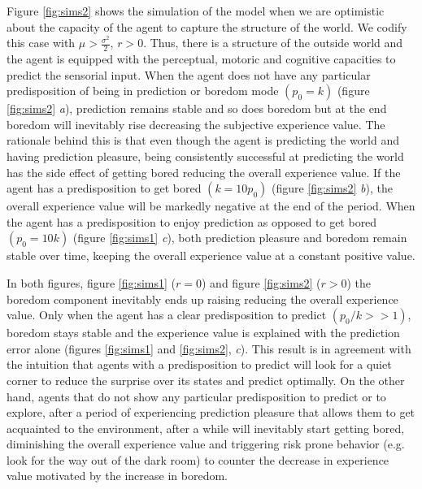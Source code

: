 \documentclass[11pt, onecolumn]{article}
\begin{document}
Figure \ref{fig:sims2} shows the simulation of the model when we are optimistic about the capacity  of the agent to capture the structure of the world. We codify this case with $ \mu > \frac{\sigma ^2}{2}$, $r>0$. Thus, there  is a structure of the outside world and the agent is equipped with the perceptual, motoric and cognitive capacities to predict the sensorial input.
When the agent does not have any particular predisposition of being in prediction or boredom mode $(p_0 = k)$ (figure \ref{fig:sims2} \emph{a}), prediction remains stable and so does boredom but at the end boredom will inevitably rise decreasing the subjective experience value. The rationale behind this is that even though the agent is predicting the world and having prediction pleasure, being consistently successful at predicting the world has the side effect of getting bored reducing the overall experience value. 
If the agent has a predisposition to  get bored $(k = 10p_0)$ (figure \ref{fig:sims2} \emph{b}), the overall experience value will be markedly negative at the end of the period. When the agent has a predisposition to enjoy prediction as opposed to get bored $(p_0 = 10k)$ (figure \ref{fig:sims1} \emph{c}), both prediction pleasure and boredom remain stable over time, keeping the overall experience value at a constant positive value.

In both figures, figure \ref{fig:sims1} ($r=0$) and figure \ref{fig:sims2} ($r>0$)   the boredom component inevitably ends up raising reducing the overall experience value. Only when the agent has a clear predisposition to predict $(p_0/k >> 1)$, boredom stays stable and the experience value is explained with the prediction error alone (figures \ref{fig:sims1} and \ref{fig:sims2}, \emph{c}). This result is in agreement with the intuition that agents with a predisposition to predict will look for a quiet corner to reduce the surprise over its states and predict optimally. On the other hand, agents that do not show any particular predisposition to predict or to explore, after a period of experiencing prediction pleasure that allows them to get acquainted to the environment, after a while will inevitably start getting bored, diminishing the overall experience value and triggering risk prone behavior (e.g. look for the way out of the dark room) to counter the decrease in experience value motivated by the increase in boredom.
\end{document}
